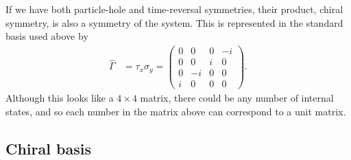 \documentclass[aps,prb,twocolumn,showpacs,superscriptaddress,10p,longbibliography]{revtex4-1}
\begin{document}
If we have both particle-hole and time-reversal symmetries, their
product, chiral symmetry, is also a symmetry of the system. This is
represented in the standard basis used above by
\begin{align}
  \hat\Gamma &= \tau_x \sigma_y
  = \begin{pmatrix} 0 & 0 & 0 & -i\\
    0 & 0 & i & 0\\
    0 & -i & 0 & 0\\
    i & 0 & 0 & 0
  \end{pmatrix}.
\end{align}
Although this looks like a $4\times 4$ matrix, there could be any
number of internal states, and so each number in the matrix above
can correspond to a unit matrix. 

\subsection{Chiral basis}
\end{document}
